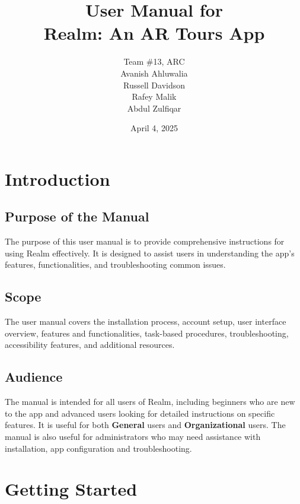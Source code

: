 \documentclass[12pt, titlepage]{article}
\newcommand{\progname}{Realm}
\newcommand{\authname}{Team \#13, ARC
    \\ Avanish Ahluwalia
    \\ Russell Davidson
    \\ Rafey Malik
    \\ Abdul Zulfiqar}
\begin{document}
\title{User Manual for \\ \progname{}: An AR Tours App}
\author{\authname}
\date{April 4, 2025}

\maketitle


\newpage

\tableofcontents

\newpage


\section{Introduction}
\subsection{Purpose of the Manual}
The purpose of this user manual is to provide comprehensive instructions for using \progname{} effectively. It is designed to assist users in understanding the app's features, functionalities, and troubleshooting common issues.

\subsection{Scope}
The user manual covers the installation process, account setup, user interface overview, features and functionalities, task-based procedures, troubleshooting, accessibility features, and additional resources.

\subsection{Audience}
The manual is intended for all users of \progname{}, including beginners who are new to the app and advanced users looking for detailed instructions on specific features. It is useful for both \textbf{General} users and \textbf{Organizational} users. The manual is also useful for administrators who may need assistance with installation, app configuration and troubleshooting.

\section{Getting Started}
\end{document}
